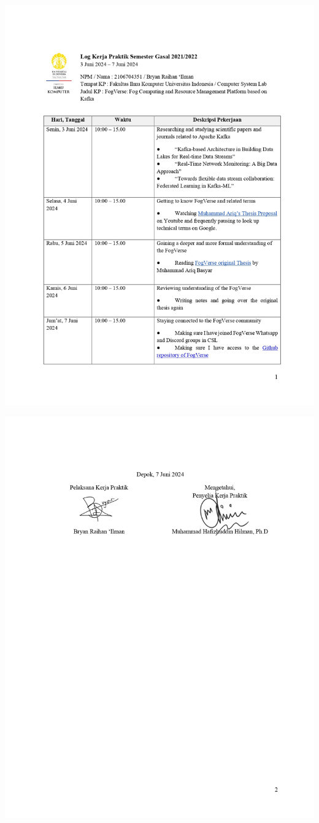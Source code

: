 \includegraphics[width=1\textwidth]{assets/pics/Log-1-CSL-Bryan Raihan Ilman-0001.jpg}

\includegraphics[width=1\textwidth]{assets/pics/Log-1-CSL-Bryan Raihan Ilman-0002.jpg}

